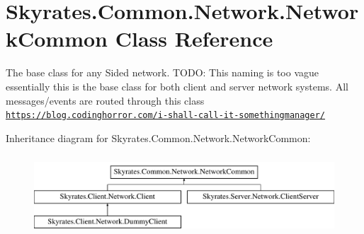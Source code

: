 \hypertarget{class_skyrates_1_1_common_1_1_network_1_1_network_common}{\section{Skyrates.\-Common.\-Network.\-Network\-Common Class Reference}
\label{class_skyrates_1_1_common_1_1_network_1_1_network_common}
}


The base class for any Sided network. T\-O\-D\-O\-: This naming is too vague essentially this is the base class for both client and server network systems. All messages/events are routed through this class \href{https://blog.codinghorror.com/i-shall-call-it-somethingmanager/}{\tt https\-://blog.\-codinghorror.\-com/i-\/shall-\/call-\/it-\/somethingmanager/}  


Inheritance diagram for Skyrates.\-Common.\-Network.\-Network\-Common\-:\begin{figure}[H]
\begin{center}
\leavevmode
\includegraphics[height=3.000000cm]{class_skyrates_1_1_common_1_1_network_1_1_network_common}
\end{center}
\end{figure}
